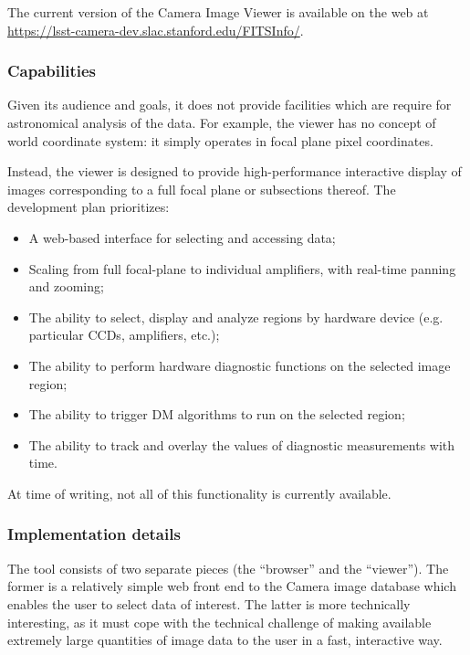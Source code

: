 The current version of the Camera Image Viewer is available on the web at \url{https://lsst-camera-dev.slac.stanford.edu/FITSInfo/}.

\subsubsection{Capabilities}

Given its audience and goals, it does not provide facilities which are require for astronomical analysis of the data.
For example, the viewer has no concept of world coordinate system: it simply operates in focal plane pixel coordinates.

Instead, the viewer is designed to provide high-performance interactive display of images corresponding to a full focal plane or subsections thereof.
The development plan prioritizes:

\begin{itemize}

  \item{A web-based interface for selecting and accessing data;}
  \item{Scaling from full focal-plane to individual amplifiers, with real-time panning and zooming;}
  \item{The ability to select, display and analyze regions by hardware device (e.g. particular CCDs, amplifiers, etc.);}
  \item{The ability to perform hardware diagnostic functions on the selected image region;}
  \item{The ability to trigger DM algorithms to run on the selected region;}
  \item{The ability to track and overlay the values of diagnostic measurements with time.}

\end{itemize}

At time of writing, not all of this functionality is currently available.

\subsubsection{Implementation details}

The tool consists of two separate pieces (the ``browser'' and the ``viewer'').
The former is a relatively simple web front end to the Camera image database which enables the user to select data of interest.
The latter is more technically interesting, as it must cope with the technical challenge of making available extremely large quantities of image data to the user in a fast, interactive way.

